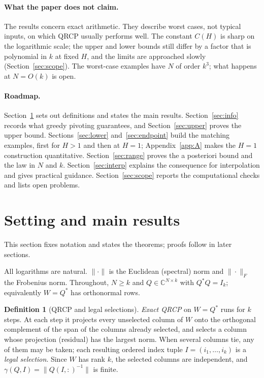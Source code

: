 \documentclass[11pt,a4paper]{article}
\theoremstyle{definition}
\newtheorem{definition}[theorem]{Definition}
\numberwithin{equation}{section}
\newcommand{\C}{\mathbb C}
\begin{document}
\paragraph{What the paper does not claim.}
The results concern exact arithmetic. They describe worst cases, not typical inputs, on which QRCP usually performs
well. The constant $C(H)$ is sharp on the logarithmic scale; the upper and lower bounds still differ by a factor
that is polynomial in $k$ at fixed $H$, and the limits are approached slowly (Section~\ref{sec:scope}). The
worst-case examples have $N$ of order $k^3$; what happens at $N=O(k)$ is open.

\paragraph{Roadmap.}
Section~\ref{sec:results} sets out definitions and states the main results. Section~\ref{sec:info} records what
greedy pivoting guarantees, and Section~\ref{sec:upper} proves the upper bound. Sections~\ref{sec:lower}
and~\ref{sec:endpoint} build the matching examples, first for $H>1$ and then at $H=1$; Appendix~\ref{app:A} makes
the $H=1$ construction quantitative. Section~\ref{sec:range} proves the a posteriori bound and the law in $N$ and
$k$. Section~\ref{sec:interp} explains the consequence for interpolation and gives practical guidance.
Section~\ref{sec:scope} reports the computational checks and lists open problems.

\section{Setting and main results}\label{sec:results}

This section fixes notation and states the theorems; proofs follow in later sections.

All logarithms are natural. $\|\cdot\|$ is the Euclidean (spectral) norm and $\|\cdot\|_F$ the Frobenius norm.
Throughout, $N\ge k$ and $Q\in\C^{N\times k}$ with $Q^*Q=I_k$; equivalently $W=Q^*$ has orthonormal rows.

\begin{definition}[QRCP and legal selections]
\emph{Exact QRCP} on $W=Q^*$ runs for $k$ steps. At each step it projects every unselected column of $W$ onto the
orthogonal complement of the span of the columns already selected, and selects a column whose projection
(residual) has the largest norm. When several columns tie, any of them may be taken; each resulting ordered index
tuple $I=(i_1,\dots,i_k)$ is a \emph{legal selection}. Since $W$ has rank $k$, the selected columns are independent,
and $\gamma(Q,I)=\|Q(I,:)^{-1}\|$ is finite.
\end{definition}
\end{document}

